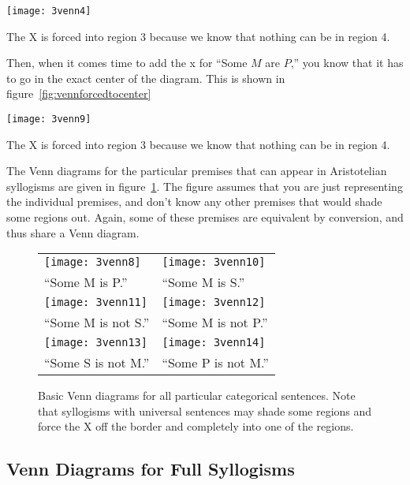 \begin{marginfigure}
\texttt{[image: 3venn4]}
\caption{The X is forced into region 3 because we know that nothing can be in region 4.}
\label{fig:vennunivex}
\end{marginfigure}

Then, when it comes time to add the x for ``Some $M$ are $P$,'' you know that it has to go in the exact center of the diagram. This is shown in figure~\ref{fig:vennforcedtocenter}

\begin{marginfigure}
\texttt{[image: 3venn9]}
\caption{The X is forced into region 3 because we know that nothing can be in region 4.}
\label{fig:vennforcedtocenter}
\end{marginfigure}

The Venn diagrams for the particular premises that can appear in Aristotelian syllogisms are given in figure~\ref{fig:part_venns}. The figure assumes that you are just representing the individual premises, and don't know any other premises that would shade some regions out. Again, some of these premises are equivalent by conversion, and thus share a Venn diagram.

\begin{figure}[!ht]
\centering
\begin{tabu}{X[1,c] X[1,c]}
\texttt{[image: 3venn8]} &
\texttt{[image: 3venn10]} \\
``Some M is P.'' & ``Some M is S.'' \\
\texttt{[image: 3venn11]} &
\texttt{[image: 3venn12]} \\
``Some M is not S.'' & ``Some M is not P.'' \\
\texttt{[image: 3venn13]} &
\texttt{[image: 3venn14]} \\
``Some S is not M.'' & ``Some P is not M.'' \\
\end{tabu}
\caption{Basic Venn diagrams for all particular categorical sentences. Note that syllogisms with universal sentences may shade some regions and force the X off the border and completely into one of the regions.}
\label{fig:part_venns}
\end{figure}

\subsection{Venn Diagrams for Full Syllogisms}

